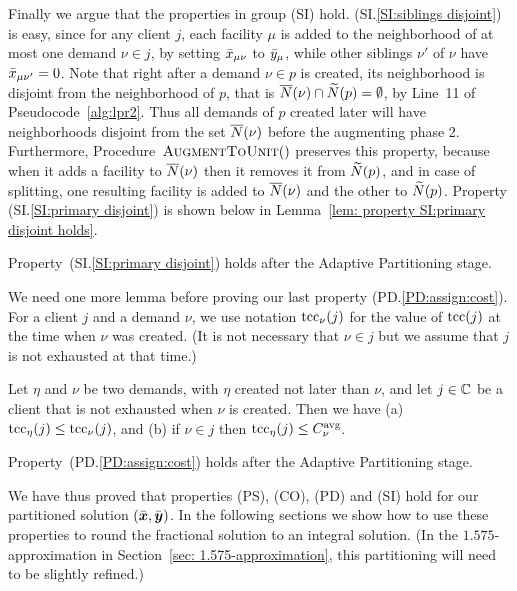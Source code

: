 \documentclass{llncs}
\begin{document}
Finally we argue that the properties in group (SI)
hold. (SI.\ref{SI:siblings disjoint}) is easy, since for any client
$j$, each facility $\mu$ is added to the neighborhood of at most one
demand $\nu\in j$, by setting ${\bar x}_{\mu\nu}$ to ${\bar y}_\mu$, while
other siblings $\nu'$ of $\nu$ have ${\bar x}_{\mu\nu'}=0$. Note that
right after a demand $\nu\in p$ is created, its neighborhood is
disjoint from the neighborhood of $p$, that is ${\overline{N}}(\nu)\cap
{\widetilde N}(p) = \emptyset$, by Line~11 of
Pseudocode~\ref{alg:lpr2}. Thus all demands of $p$ created later will
have neighborhoods disjoint from the set ${\overline{N}}(\nu)$ before the
augmenting phase 2. Furthermore, Procedure~${\textsc{AugmentToUnit}}()$
preserves this property, because when it adds a facility to
${\overline{N}}(\nu)$ then it removes it from ${\widetilde N}(p)$, and in case of
splitting, one resulting facility is added to ${\overline{N}}(\nu)$ and the
other to ${\widetilde N}(p)$. Property (SI.\ref{SI:primary disjoint}) is
shown below in Lemma~\ref{lem: property SI:primary disjoint holds}.


\begin{lemma}\label{lem: property SI:primary disjoint holds}
  Property~(SI.\ref{SI:primary disjoint}) holds after the
  Adaptive Partitioning stage.
\end{lemma}



We need one more lemma before proving our last property
(PD.\ref{PD:assign:cost}).  For a client $j$ and a demand
$\nu$, we use notation $\textrm{tcc}_{\nu}(j)$ for the value of
$\textrm{tcc}(j)$ at the time when $\nu$ was created. (It is not
necessary that $\nu\in j$ but we assume that $j$ is not
exhausted at that time.)


\begin{lemma}\label{lem: tcc optimal}
  Let $\eta$ and $\nu$ be two demands, with $\eta$ created not later
  than $\nu$, and let $j\in\mathbb{C}$ be a client that is not
  exhausted when $\nu$ is created. Then we have (a) $\textrm{tcc}_\eta(j) \le
  \textrm{tcc}_{\nu}(j)$, and (b) if $\nu\in j$ then $\textrm{tcc}_\eta(j) \le
  C^{{\mbox{\scriptsize\rm avg}}}_{\nu}$.

\end{lemma}


\begin{lemma}\label{lem: PD:assign:cost holds}
Property~(PD.\ref{PD:assign:cost}) holds after the Adaptive Partitioning stage.
\end{lemma}

We have thus proved that properties (PS), (CO), (PD) and (SI) hold
for our partitioned solution $(\bar{\boldsymbol{x}},\bar{\boldsymbol{y}})$. In the
following sections we show how to use these properties to round the
fractional solution to an integral solution. 
(In the $1.575$-approximation in Section~\ref{sec:
  1.575-approximation}, this partitioning will need to be slightly
refined.)
\end{document}
